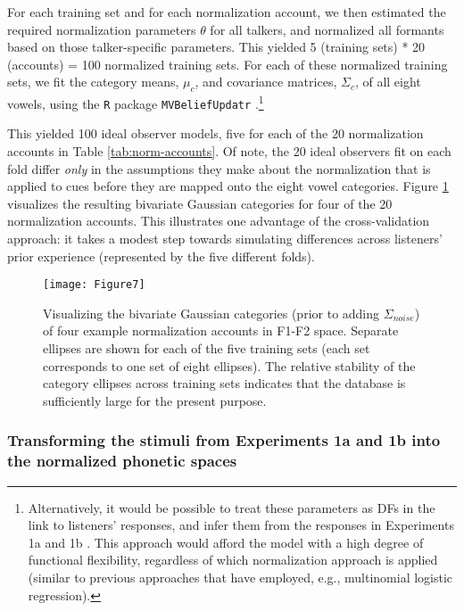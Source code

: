 \documentclass[preprint]{JASA}
\begin{document}
For each training set and for each normalization account, we then estimated the required normalization parameters \(\theta\) for all talkers, and normalized all formants based on those talker-specific parameters. This yielded 5 (training sets) * 20 (accounts) = 100 normalized training sets. For each of these normalized training sets, we fit the category means, \(\mu_c\), and covariance matrices, \(\Sigma_c\), of all eight vowels, using the \texttt{R} package \texttt{MVBeliefUpdatr} \citep{jaeger2024}.\footnote{Alternatively, it would be possible to treat these parameters as DFs in the link to listeners' responses, and infer them from the responses in Experiments 1a and 1b \citep[cf.,][]{kleinschmidt-jaeger2016}. This approach would afford the model with a high degree of functional flexibility, regardless of which normalization approach is applied (similar to previous approaches that have employed, e.g., multinomial logistic regression).}

This yielded 100 ideal observer models, five for each of the 20 normalization accounts in Table \ref{tab:norm-accounts}. Of note, the 20 ideal observers fit on each fold differ \emph{only} in the assumptions they make about the normalization that is applied to cues before they are mapped onto the eight vowel categories. Figure \ref{fig:Figure7} visualizes the resulting bivariate Gaussian categories for four of the 20 normalization accounts. This illustrates one advantage of the cross-validation approach: it takes a modest step towards simulating differences across listeners' prior experience (represented by the five different folds).



\begin{figure}[!ht]

{\centering \texttt{[image: Figure7]} 

}

\caption{Visualizing the bivariate Gaussian categories (prior to adding \(\Sigma_{noise}\)) of four example normalization accounts in F1-F2 space. Separate ellipses are shown for each of the five training sets (each set corresponds to one set of eight ellipses). The relative stability of the category ellipses across training sets indicates that the database is sufficiently large for the present purpose.}\label{fig:Figure7}
\end{figure}

\subsubsection{Transforming the stimuli from Experiments 1a and 1b into the normalized phonetic spaces}\label{transforming-the-stimuli-from-experiments-1a-and-1b-into-the-normalized-phonetic-spaces}
\end{document}
